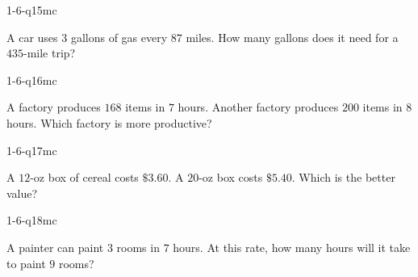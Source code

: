 \begin{practiceQuestion}{1-6-q15}{mc}
\begin{questionText}
A car uses $3$ gallons of gas every $87$ miles. How many gallons does it need for a $435$-mile trip?
\end{questionText}
\end{practiceQuestion}

\begin{practiceQuestion}{1-6-q16}{mc}
\begin{questionText}
A factory produces $168$ items in $7$ hours. Another factory produces $200$ items in $8$ hours. Which factory is more productive?
\end{questionText}
\end{practiceQuestion}

\begin{practiceQuestion}{1-6-q17}{mc}
\begin{questionText}
A $12$-oz box of cereal costs $\$3.60$. A $20$-oz box costs $\$5.40$. Which is the better value?
\end{questionText}
\end{practiceQuestion}

\begin{practiceQuestion}{1-6-q18}{mc}
\begin{questionText}
A painter can paint $3$ rooms in $7$ hours. At this rate, how many hours will it take to paint $9$ rooms?
\end{questionText}
\end{practiceQuestion}


